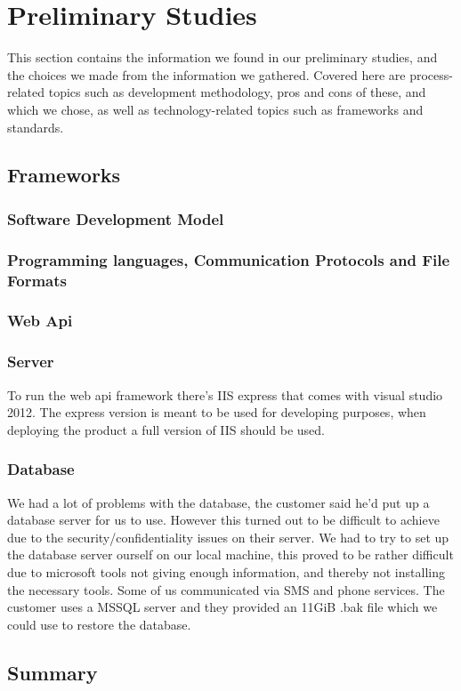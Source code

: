\section{Preliminary Studies}
This section contains the information we found in our preliminary studies, and the choices we made from the information we gathered. Covered here are process-related topics such as development methodology, pros and cons of these, and which we chose, as well as technology-related topics such as frameworks and standards.

\subsection{Frameworks}
\subsubsection{Software Development Model}
\subsubsection{Programming languages, Communication Protocols and File Formats}
\subsubsection{Web Api}
\subsubsection{Server}
To run the web api framework there's IIS express that comes with visual studio 2012. The express version is meant to be used for developing purposes, when deploying the product a full version of IIS should be used.
\subsubsection{Database}
We had a lot of problems with the database, the customer said he'd put up a database server for us to use. However this turned out to be difficult to achieve due to the security/confidentiality issues on their server. We had to try to set up the database server ourself on our local machine, this proved to be rather difficult due to microsoft tools not giving enough information, and thereby not installing the necessary tools. Some of us communicated via SMS and phone services.
The customer uses a MSSQL server and they provided an 11GiB .bak file which we could use to restore the database.


\subsection{Summary}